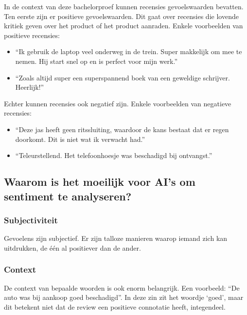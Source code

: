In de context van deze bachelorproef kunnen recensies gevoelswaarden bevatten. Ten eerste zijn er positieve gevoelswaarden. Dit gaat over recensies die lovende kritiek geven over het product of het product aanraden. Enkele voorbeelden van positieve recensies: 

\begin{itemize}
    \item “Ik gebruik de laptop veel onderweg in de trein. Super makkelijk om mee te nemen. Hij start snel op en is perfect voor mijn werk.”
    \item “Zoals altijd super een superspannend boek van een geweldige schrijver. Heerlijk!”
\end{itemize}

Echter kunnen recensies ook negatief zijn. Enkele voorbeelden van negatieve recensies:

\begin{itemize}
    \item “Deze jas heeft geen ritssluiting, waardoor de kans bestaat dat er regen doorkomt. Dit is niet wat ik verwacht had.”
    \item “Teleurstellend. Het telefoonhoesje was beschadigd bij ontvangst.”
\end{itemize}

\subsection{Waarom is het moeilijk voor AI's om sentiment te analyseren?}
\label{moeilijksentimentanalyseren}

\subsubsection{Subjectiviteit}
\label{subjectiviteit}

Gevoelens zijn subjectief. Er zijn talloze manieren waarop iemand zich kan uitdrukken, de één al positiever dan de ander. 

\subsubsection{Context}
\label{context}

De context van bepaalde woorden is ook enorm belangrijk. Een voorbeeld: “De auto was bij aankoop goed beschadigd”. In deze zin zit het woordje ‘goed’, maar dit betekent niet dat de review een positieve connotatie heeft, integendeel. \autocite{MonkeyLearn2021}

